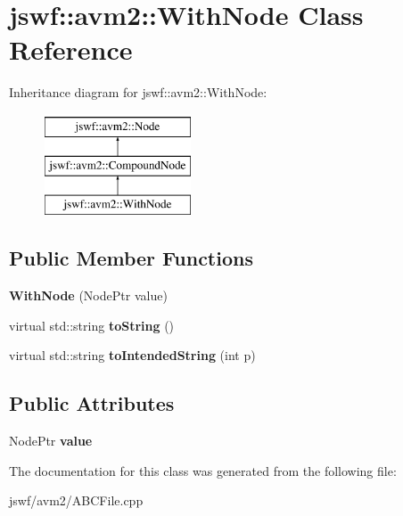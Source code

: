 \hypertarget{classjswf_1_1avm2_1_1_with_node}{\section{jswf\+:\+:avm2\+:\+:With\+Node Class Reference}
\label{classjswf_1_1avm2_1_1_with_node}
}
Inheritance diagram for jswf\+:\+:avm2\+:\+:With\+Node\+:\begin{figure}[H]
\begin{center}
\leavevmode
\includegraphics[height=3.000000cm]{classjswf_1_1avm2_1_1_with_node}
\end{center}
\end{figure}
\subsection*{Public Member Functions}
\begin{DoxyCompactItemize}
\item 
\hypertarget{classjswf_1_1avm2_1_1_with_node_a1e5f301679f3f92d959303899419a3b5}{{\bfseries With\+Node} (Node\+Ptr value)}\label{classjswf_1_1avm2_1_1_with_node_a1e5f301679f3f92d959303899419a3b5}

\item 
\hypertarget{classjswf_1_1avm2_1_1_with_node_a5a7a305de437bc78deb5a56e2c7f4896}{virtual std\+::string {\bfseries to\+String} ()}\label{classjswf_1_1avm2_1_1_with_node_a5a7a305de437bc78deb5a56e2c7f4896}

\item 
\hypertarget{classjswf_1_1avm2_1_1_with_node_a1f86337e207fcb98d8dd1b7bcb018a38}{virtual std\+::string {\bfseries to\+Intended\+String} (int p)}\label{classjswf_1_1avm2_1_1_with_node_a1f86337e207fcb98d8dd1b7bcb018a38}

\end{DoxyCompactItemize}
\subsection*{Public Attributes}
\begin{DoxyCompactItemize}
\item 
\hypertarget{classjswf_1_1avm2_1_1_with_node_ac41457a43ee72f5481d1f7e1528434dc}{Node\+Ptr {\bfseries value}}\label{classjswf_1_1avm2_1_1_with_node_ac41457a43ee72f5481d1f7e1528434dc}

\end{DoxyCompactItemize}


The documentation for this class was generated from the following file\+:\begin{DoxyCompactItemize}
\item 
jswf/avm2/A\+B\+C\+File.\+cpp\end{DoxyCompactItemize}
